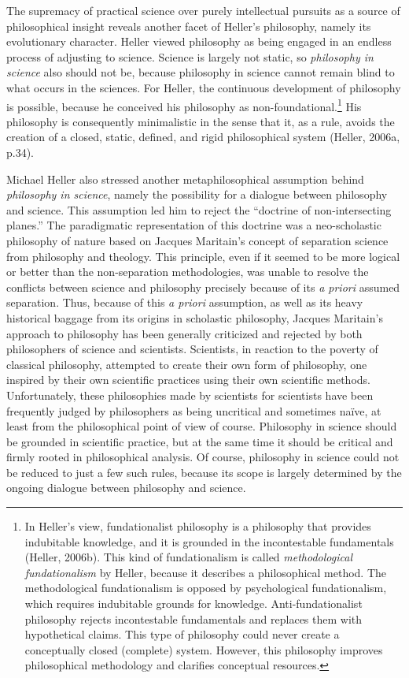 \documentclass[a4paper]{article}
\begin{document}
The supremacy of practical science over purely intellectual pursuits as a source of philosophical insight reveals
another facet of Heller’s philosophy, namely its evolutionary character. Heller viewed philosophy as being engaged in
an endless process of adjusting to science. Science is largely not static, so \textit{philosophy in science }also
should not be, because philosophy in science cannot remain blind to what occurs in the sciences. For Heller, the
continuous development of philosophy is possible, because he conceived his philosophy as non-foundational.\footnote{In
Heller’s view, fundationalist philosophy is a philosophy that provides indubitable knowledge, and it is grounded in the
incontestable fundamentals (Heller, 2006b). This kind of fundationalism is called \textit{methodological fundationalism
}by Heller, because it describes a philosophical method. The methodological fundationalism is opposed by psychological
fundationalism, which requires indubitable grounds for knowledge. Anti-fundationalist philosophy rejects incontestable
fundamentals and replaces them with hypothetical claims. This type of philosophy could never create a conceptually
closed (complete) system. However, this philosophy improves philosophical methodology and clarifies conceptual
resources.} His philosophy is consequently minimalistic in the sense that it, as a rule, avoids the creation of a
closed, static, defined, and rigid philosophical system (Heller, 2006a, p.34).

Michael Heller also stressed another metaphilosophical assumption behind \textit{philosophy in science}, namely the
possibility for a dialogue between philosophy and science. This assumption led him to reject the “doctrine of
non-intersecting planes.” The paradigmatic representation of this doctrine was a neo-scholastic philosophy of nature
based on Jacques Maritain’s concept of separation science from philosophy and theology. This principle, even if it
seemed to be more logical or better than the non-separation methodologies, was unable to resolve the conflicts between
science and philosophy precisely because of its \textit{a priori} assumed separation. Thus, because of this\textit{ a
priori} assumption, as well as its heavy historical baggage from its origins in scholastic philosophy, Jacques
Maritain’s approach to philosophy has been generally criticized and rejected by both philosophers of science and
scientists. Scientists, in reaction to the poverty of classical philosophy, attempted to create their own form of
philosophy, one inspired by their own scientific practices using their own scientific methods. Unfortunately, these
philosophies made by scientists for scientists have been frequently judged by philosophers as being uncritical and
sometimes naïve, at least from the philosophical point of view of course. Philosophy in science should be grounded in
scientific practice, but at the same time it should be critical and firmly rooted in philosophical analysis. Of course,
philosophy in science could not be reduced to just a few such rules, because its scope is largely determined by the
ongoing dialogue between philosophy and science. 
\end{document}
